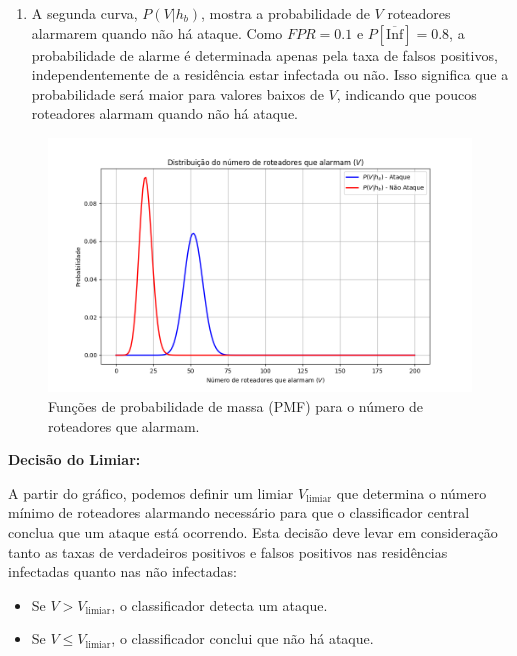 \documentclass[12 pt]{article}
\begin{document}
\begin{enumerate}
\begin{tcolorbox}[colback=white, colframe=black, title=Resposta (continuação):]
\begin{enumerate}
            \item A segunda curva, \( P(V | h_b) \), mostra a probabilidade de \( V \) roteadores alarmarem quando não há ataque. Como \( FPR = 0.1 \) e \( P[\overline{\text{Inf}}] = 0.8 \), a probabilidade de alarme é determinada apenas pela taxa de falsos positivos, independentemente de a residência estar infectada ou não. Isso significa que a probabilidade será maior para valores baixos de \( V \), indicando que poucos roteadores alarmam quando não há ataque.
        \end{enumerate}


    \end{tcolorbox}

    \begin{figure}[H]
        \centering
        \includegraphics[width=\textwidth]{fig/item_9.png}
        \caption{Funções de probabilidade de massa (PMF) para o número de roteadores que alarmam.}
        \label{fig:pmf}
    \end{figure}

    \begin{tcolorbox}[colback=white, colframe=black, title=Resposta (continuação):]
        
        \textbf{Decisão do Limiar:}
        
        A partir do gráfico, podemos definir um limiar \( V_{\text{limiar}} \) que determina o número mínimo de roteadores alarmando necessário para que o classificador central conclua que um ataque está ocorrendo. Esta decisão deve levar em consideração tanto as taxas de verdadeiros positivos e falsos positivos nas residências infectadas quanto nas não infectadas:
        \begin{itemize}
            \item Se \( V > V_{\text{limiar}} \), o classificador detecta um ataque.
            \item Se \( V \leq V_{\text{limiar}} \), o classificador conclui que não há ataque.
        \end{itemize}
        

\end{tcolorbox}
\end{enumerate}
\end{document}
